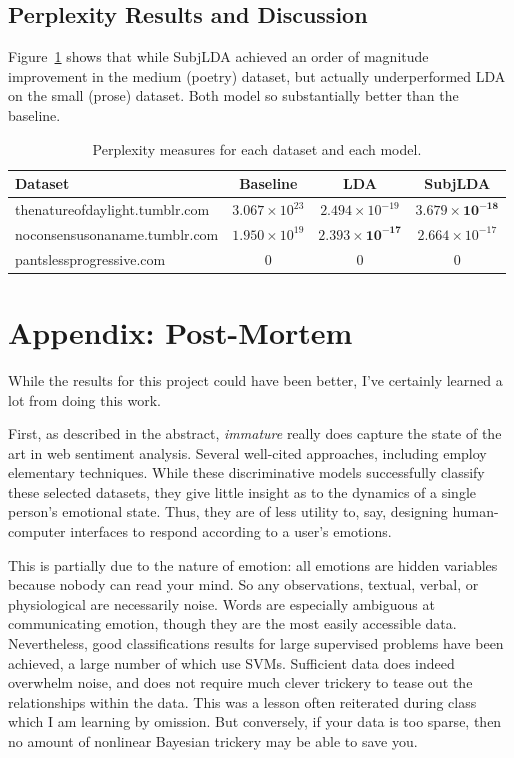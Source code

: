 \documentclass{article}
\begin{document}
\subsection{Perplexity Results and Discussion}
Figure~\ref{tab:perp} shows that while SubjLDA achieved an order
of magnitude improvement in the medium (poetry) dataset, but actually
underperformed LDA on the small (prose) dataset. Both model so
substantially better than the baseline.

\begin{table}
\centering
\begin{tabular}{l c c c}
\bf Dataset & \bf Baseline & \bf LDA & \bf SubjLDA \\
\hline
thenatureofdaylight.tumblr.com & $3.067 \times 10^{23}$ & $2.494 \times 10^{-19}$ & $\mathbf{3.679 \times 10^{-18}} $ \\
noconsensusonaname.tumblr.com & $1.950 \times 10^{19}$ & $\mathbf{2.393 \times 10^{-17}}$ & $2.664 \times 10^{-17}$ \\
pantslessprogressive.com & 0 & 0 & 0 \\
\end{tabular}
\caption{Perplexity measures for each dataset and each model.\label{tab:perp}}
\end{table}


\begin{small}

 
\end{small}
\section*{Appendix: Post-Mortem}
While the results for this project could have been better, I've
certainly learned a lot from doing this work.

First, as described in the abstract, \emph{immature} really does
capture the state of the art in web sentiment analysis. Several
well-cited approaches, including \citep{mishne06, alm08, sood09}
employ elementary techniques. While these discriminative models
successfully classify these selected datasets, they give little
insight as to the dynamics of a single person's emotional state.
Thus, they are of less utility to, say, designing human-computer
interfaces to respond according to a user's emotions.

This is partially due to the nature of emotion: all emotions
are hidden variables because nobody can read your mind. So any
observations, textual, verbal, or physiological are necessarily
noise. Words are especially ambiguous at communicating emotion,
though they are the most easily accessible data. Nevertheless, good
classifications results for large supervised problems have been
achieved, a large number of which use SVMs. Sufficient data does
indeed overwhelm noise, and does not require much clever trickery
to tease out the relationships within the data. This was a lesson
often reiterated during class which I am learning by omission. But
conversely, if your data is too sparse, then no amount of nonlinear
Bayesian trickery may be able to save you.
\end{document}
